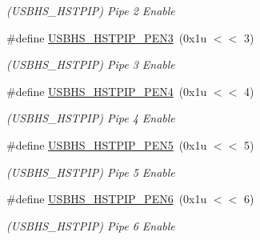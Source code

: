 \begin{DoxyCompactItemize}
\begin{DoxyCompactList}\small\item\em (U\+S\+B\+H\+S\+\_\+\+H\+S\+T\+P\+IP) Pipe 2 Enable \end{DoxyCompactList}\item 
\mbox{\label{group__SAMV71__USBHS_ga96beaeeda6d25f9fa3be010d27498b15}} 
\#define \mbox{\hyperlink{group__SAMV71__USBHS_ga96beaeeda6d25f9fa3be010d27498b15}{U\+S\+B\+H\+S\+\_\+\+H\+S\+T\+P\+I\+P\+\_\+\+P\+E\+N3}}~(0x1u $<$$<$ 3)
\begin{DoxyCompactList}\small\item\em (U\+S\+B\+H\+S\+\_\+\+H\+S\+T\+P\+IP) Pipe 3 Enable \end{DoxyCompactList}\item 
\mbox{\label{group__SAMV71__USBHS_ga6888c4a72b7f8dd35a18e00c6a6daacf}} 
\#define \mbox{\hyperlink{group__SAMV71__USBHS_ga6888c4a72b7f8dd35a18e00c6a6daacf}{U\+S\+B\+H\+S\+\_\+\+H\+S\+T\+P\+I\+P\+\_\+\+P\+E\+N4}}~(0x1u $<$$<$ 4)
\begin{DoxyCompactList}\small\item\em (U\+S\+B\+H\+S\+\_\+\+H\+S\+T\+P\+IP) Pipe 4 Enable \end{DoxyCompactList}\item 
\mbox{\label{group__SAMV71__USBHS_gaab5c7f817eb4da9974b885d7b9de06dc}} 
\#define \mbox{\hyperlink{group__SAMV71__USBHS_gaab5c7f817eb4da9974b885d7b9de06dc}{U\+S\+B\+H\+S\+\_\+\+H\+S\+T\+P\+I\+P\+\_\+\+P\+E\+N5}}~(0x1u $<$$<$ 5)
\begin{DoxyCompactList}\small\item\em (U\+S\+B\+H\+S\+\_\+\+H\+S\+T\+P\+IP) Pipe 5 Enable \end{DoxyCompactList}\item 
\mbox{\label{group__SAMV71__USBHS_ga228d055418ac3fa91258155644bef5aa}} 
\#define \mbox{\hyperlink{group__SAMV71__USBHS_ga228d055418ac3fa91258155644bef5aa}{U\+S\+B\+H\+S\+\_\+\+H\+S\+T\+P\+I\+P\+\_\+\+P\+E\+N6}}~(0x1u $<$$<$ 6)
\begin{DoxyCompactList}\small\item\em (U\+S\+B\+H\+S\+\_\+\+H\+S\+T\+P\+IP) Pipe 6 Enable \end{DoxyCompactList}\item 
\mbox{\label{group__SAMV71__USBHS_ga25f985d289cb1cfd228ca1829157ce2a}} 

\end{DoxyCompactItemize}
